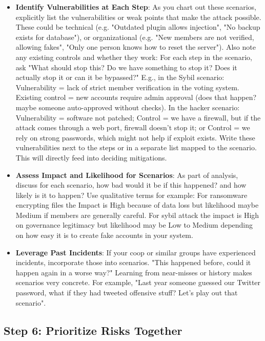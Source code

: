 \begin{itemize}
    \item \textbf{Identify Vulnerabilities at Each Step}: As you chart out these scenarios, explicitly list the
    vulnerabilities or weak points that make the attack possible. These could be technical (e.g.
    "Outdated plugin allows injection", "No backup exists for database"), or organizational (e.g. "New
    members are not verified, allowing fakes", "Only one person knows how to reset the server"). Also
    note any existing controls and whether they work: For each step in the scenario, ask "What should
    stop this? Do we have something to stop it? Does it actually stop it or can it be bypassed?"
    E.g., in the Sybil scenario: Vulnerability = lack of strict member verification in the
    voting system. Existing control = new accounts require admin approval (does that happen? maybe
    someone auto-approved without checks).
    In the hacker scenario: Vulnerability = software not patched; Control = we have a
    firewall, but if the attack comes through a web port, firewall doesn't stop it; or Control = we rely
    on strong passwords, which might not help if exploit exists.
    Write these vulnerabilities next to the steps or in a separate list mapped to the
    scenario. This will directly feed into deciding mitigations.

    \item \textbf{Assess Impact and Likelihood for Scenarios}: As part of analysis, discuss for each scenario,
    how bad would it be if this happened? and how likely is it to happen? Use qualitative terms for example:
    For ransomware encrypting files the Impact is High because of data loss but likelihood maybe Medium
    if members are generally careful. For sybil attack the impact is High on governance
    legitimacy but likelihood may be Low to Medium depending on how easy it is to create fake accounts in your
    system.

    \item \textbf{Leverage Past Incidents}: If your coop or similar groups have experienced incidents,
    incorporate those into scenarios. "This happened before, could it happen again in a worse way?"
    Learning from near-misses or history makes scenarios very concrete. For example, "Last year someone
    guessed our Twitter password, what if they had tweeted offensive stuff? Let's play out that
    scenario".
\end{itemize}

\subsection{Step 6: Prioritize Risks Together}
\label{subsec:Step6}

